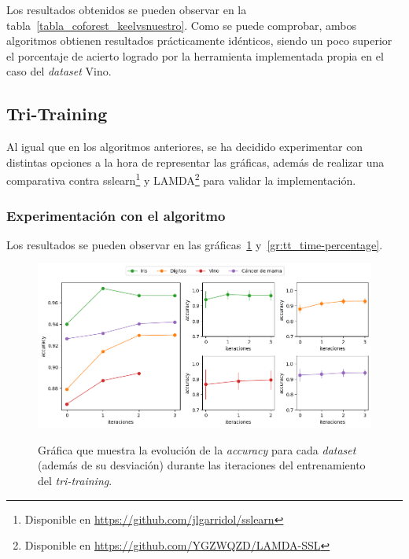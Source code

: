 Los resultados obtenidos se pueden observar en la tabla~\ref{tabla_coforest_keelvsnuestro}. Como se puede comprobar, ambos algoritmos obtienen resultados prácticamente idénticos, siendo un poco superior el porcentaje de acierto logrado por la herramienta implementada propia en el caso del \textit{dataset} Vino.


\subsection{Tri-Training}

Al igual que en los algoritmos anteriores, se ha decidido experimentar con distintas opciones a la hora de representar las gráficas, además de realizar una comparativa contra sslearn\footnote{ Disponible en {\url{https://github.com/jlgarridol/sslearn}}} y LAMDA\footnote{Disponible en {\url{https://github.com/YGZWQZD/LAMDA-SSL}}} para validar la implementación.


\subsubsection{Experimentación con el algoritmo}

Los resultados se pueden observar en las gráficas~\ref{gr:tt_train-iterations} y~\ref{gr:tt_time-percentage}.

\begin{figure}[h]
	\caption[\textit{Tri-training}: resultados (iteraciones-entrenamiento)]{Gráfica que muestra la evolución de la \textit{accuracy} para cada \textit{dataset} (además de su desviación) durante las iteraciones del entrenamiento del \textit{tri-training}.}
	\centering
	\includegraphics[scale=0.5]{../img/memoria/5_tritraining_score-iteraciones}
	\label{gr:tt_train-iterations}
\end{figure}

